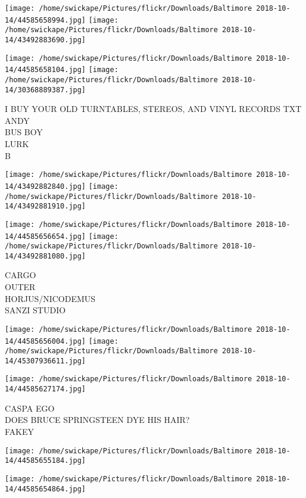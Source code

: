 \documentclass[10pt,letterpaper]{article}
\begin{document}
\texttt{[image: /home/swickape/Pictures/flickr/Downloads/Baltimore 2018-10-14/44585658994.jpg]}
\texttt{[image: /home/swickape/Pictures/flickr/Downloads/Baltimore 2018-10-14/43492883690.jpg]}

\texttt{[image: /home/swickape/Pictures/flickr/Downloads/Baltimore 2018-10-14/44585658104.jpg]}
\texttt{[image: /home/swickape/Pictures/flickr/Downloads/Baltimore 2018-10-14/30368889387.jpg]}

I BUY YOUR OLD TURNTABLES, STEREOS, AND VINYL RECORDS TXT ANDY\\
BUS BOY\\
LURK\\
B\\
\pagebreak

\texttt{[image: /home/swickape/Pictures/flickr/Downloads/Baltimore 2018-10-14/43492882840.jpg]}
\texttt{[image: /home/swickape/Pictures/flickr/Downloads/Baltimore 2018-10-14/43492881910.jpg]}

\texttt{[image: /home/swickape/Pictures/flickr/Downloads/Baltimore 2018-10-14/44585656654.jpg]}
\texttt{[image: /home/swickape/Pictures/flickr/Downloads/Baltimore 2018-10-14/43492881080.jpg]}

CARGO\\
OUTER\\
HORJUS/NICODEMUS\\
SANZI STUDIO\\
\pagebreak

\texttt{[image: /home/swickape/Pictures/flickr/Downloads/Baltimore 2018-10-14/44585656004.jpg]}
\texttt{[image: /home/swickape/Pictures/flickr/Downloads/Baltimore 2018-10-14/45307936611.jpg]}

\texttt{[image: /home/swickape/Pictures/flickr/Downloads/Baltimore 2018-10-14/44585627174.jpg]}

CASPA EGO\\
DOES BRUCE SPRINGSTEEN DYE HIS HAIR?\\
FAKEY\\
\pagebreak

\texttt{[image: /home/swickape/Pictures/flickr/Downloads/Baltimore 2018-10-14/44585655184.jpg]}

\vspace{0.25in}
\texttt{[image: /home/swickape/Pictures/flickr/Downloads/Baltimore 2018-10-14/44585654864.jpg]}
\end{document}
